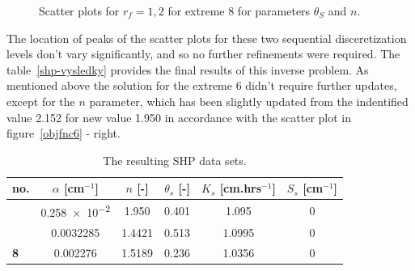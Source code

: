 \documentclass[review]{elsarticle}
\begin{document}
\begin{figure}[htb!]
\label{ext6rf1-an2-example}
\caption{Scatter plots for $r_f=1,2$ for extreme 8 for parameters $\theta_S$ and $n$.}
\end{figure}


The location of peaks of the scatter plots for these two sequential disceretization levels don't vary significantly, and so no further refinements were required. The table~\ref{shp-vysledky} provides the final results of this inverse problem. As mentioned above the solution for the extreme 6 didn't require further updates, except for  the $n$ parameter, which has been slightly updated from the indentified value 2.152 for new value 1.950 in accordance with the scatter plot in figure~\ref{objfnc6} - right.

\begin{table}[ht]
\centering
\caption{The resulting SHP data sets.}
 \begin{small}
\begin{tabular}{l || c c c c c }
\toprule
no. & $\alpha$ [cm$^{-1}$] & $n$ [-] & $\theta_s$ [-] & $K_s$ [cm.hrs$^{-1}$] & $S_s$  [cm$^{-1}$]\\ \hline \hline
\rowcolor{white}{\bf 6} & \num{0.258e-2} & \num{1.950}  & 0.401 &  \num{1.095} & 0  \\ 
\rowcolor{white}{\bf 7} & \num{0.0032285} & \num{1.4421} & 0.513 &  \num{1.0995} & 0  \\ 
\rowcolor{white} {\bf 8} & \num{0.002276} & \num{1.5189} & 0.236 &  \num{1.0356} &  \num{0}\\ \hline
\toprule
\end{tabular}
 \end{small}
\label{shp-vysledky-final}
\end{table}
\end{document}
